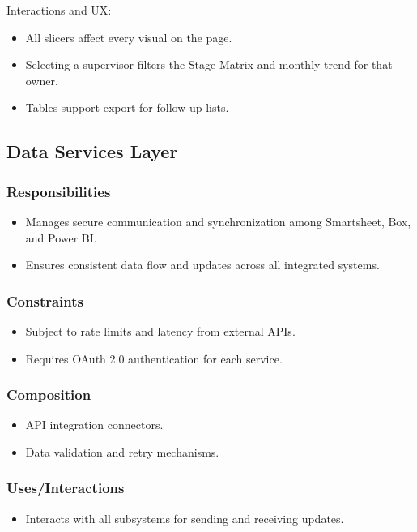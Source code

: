 \documentclass[12pt]{article}
\def\textbf#1{#1}%
\def\&{ and }%
\begin{document}
\textbf{Interactions \& UX:}
\begin{itemize}[nosep]
  \item All slicers affect every visual on the page.
  \item Selecting a supervisor filters the Stage Matrix and monthly trend for that owner.
  \item Tables support export for follow-up lists.
\end{itemize}


\subsection{Data Services Layer}
\subsubsection{Responsibilities}
\begin{itemize}[nosep]
  \item Manages secure communication and synchronization among Smartsheet, Box, and Power BI.
  \item Ensures consistent data flow and updates across all integrated systems.
\end{itemize}

\subsubsection{Constraints}
\begin{itemize}[nosep]
  \item Subject to rate limits and latency from external APIs.
  \item Requires OAuth 2.0 authentication for each service.
\end{itemize}

\subsubsection{Composition}
\begin{itemize}[nosep]
  \item API integration connectors.
  \item Data validation and retry mechanisms.
\end{itemize}

\subsubsection{Uses/Interactions}
\begin{itemize}[nosep]
  \item Interacts with all subsystems for sending and receiving updates.
\end{itemize}
\end{document}
